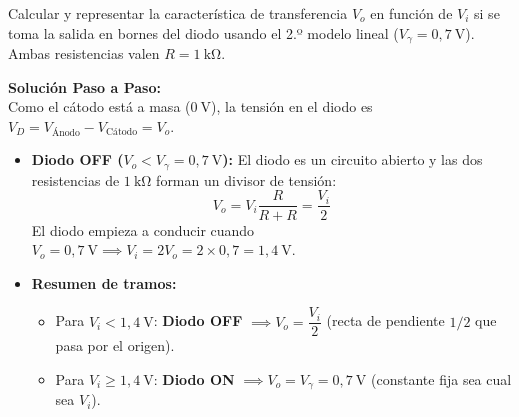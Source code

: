 \begin{ejercicio}
Calcular y representar la característica de transferencia $V_o$ en función de $V_i$ si se toma la salida en bornes del diodo usando el 2.º modelo lineal ($V_\gamma = 0{,}7\ \si{\volt}$). Ambas resistencias valen $R = 1\ \si{\kilo\ohm}$.
\tcbline
\begin{center}
\end{center}
\textbf{Solución Paso a Paso:}\\[4pt]
Como el cátodo está a masa ($0\ \si{\volt}$), la tensión en el diodo es $V_D = V_{\text{Ánodo}} - V_{\text{Cátodo}} = V_o$.
\begin{itemize}[leftmargin=*]
    \item \textbf{Diodo OFF ($V_o < V_\gamma = 0{,}7\ \si{\volt}$):} El diodo es un circuito abierto y las dos resistencias de $1\ \si{\kilo\ohm}$ forman un divisor de tensión:
    \begin{equation}
        V_o = V_i \frac{R}{R + R} = \frac{V_i}{2}
    \end{equation}
    El diodo empieza a conducir cuando $V_o = 0{,}7\ \si{\volt} \implies V_i = 2 V_o = 2 \times 0{,}7 = 1{,}4\ \si{\volt}$.
    \item \textbf{Resumen de tramos:}
    \begin{itemize}
        \item Para $V_i < 1{,}4\ \si{\volt}$: \textbf{Diodo OFF} $\implies V_o = \dfrac{V_i}{2}$ (recta de pendiente $1/2$ que pasa por el origen).
        \item Para $V_i \ge 1{,}4\ \si{\volt}$: \textbf{Diodo ON} $\implies V_o = V_\gamma = 0{,}7\ \si{\volt}$ (constante fija sea cual sea $V_i$).
    \end{itemize}
\end{itemize}
\end{ejercicio}

